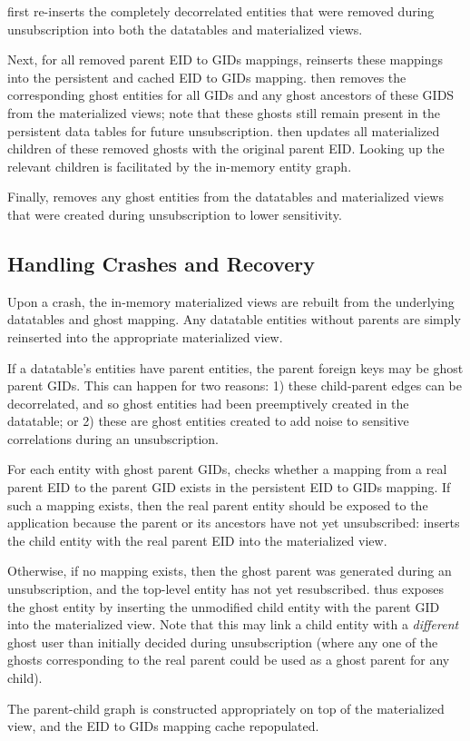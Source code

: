 \name first re-inserts the completely decorrelated entities that were removed during unsubscription
into both the datatables and materialized views.

Next, for all removed parent EID to GIDs mappings, \name reinserts these mappings into the
persistent and cached EID to GIDs mapping.
\name then removes the corresponding ghost entities for all GIDs and any ghost ancestors of these
GIDS from the materialized views; note that these ghosts still remain present in the
persistent data tables for future unsubscription.
\name then updates all materialized children of these removed ghosts with the original parent EID. Looking up the relevant
children is facilitated by the in-memory entity graph.

Finally, \name removes any
ghost entities from the datatables and materialized views that were created during unsubscription to
lower sensitivity.

\subsection{Handling Crashes and Recovery}
Upon a crash, the in-memory materialized views are rebuilt from the underlying datatables and ghost
mapping. Any datatable entities without parents are simply reinserted into the appropriate
materialized view.

If a datatable's entities have parent entities, the parent foreign keys may be ghost parent GIDs.
This can happen for two reasons: 1) these child-parent edges can be decorrelated, and so ghost
entities had been preemptively created in the datatable; or 2) these are ghost entities created to
add noise to sensitive correlations during an unsubscription.

For each entity with ghost parent GIDs, \name checks whether a mapping
from a real parent EID to the parent GID exists in the persistent EID to GIDs mapping.
If such a mapping exists, then the real parent entity should be exposed to the application because
the parent or its ancestors have not yet unsubscribed: \name inserts the child entity with the real parent
EID into the materialized view.

Otherwise, if no mapping exists, then the ghost parent was generated during an unsubscription, and
the top-level entity has not yet resubscribed. \name thus exposes the ghost entity by inserting the
unmodified child entity with the parent GID into the materialized view.
Note that this may link a child entity with a \emph{different} ghost user than initially decided
during unsubscription (where any one of the ghosts corresponding to the real parent could be used as
a ghost parent for any child).

The parent-child graph is constructed appropriately on top of the materialized view, and the EID to
GIDs mapping cache repopulated.

\fi
